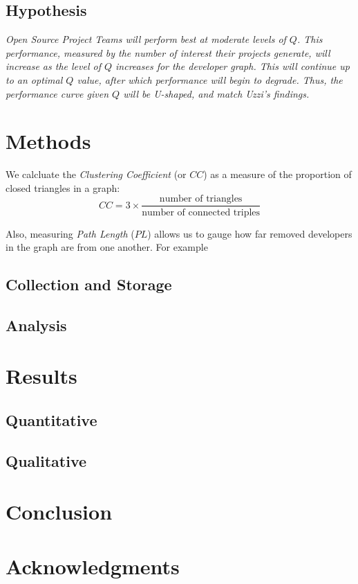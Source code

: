 \documentclass{proc}
\begin{document}
\subsection{Hypothesis}

\textit{Open Source Project Teams will perform best at moderate levels of $Q$. This performance, measured by the number of interest their projects generate, will increase as the level of $Q$ increases for the developer graph. This will continue up to an optimal $Q$ value, after which performance will begin to degrade. Thus, the performance curve given $Q$ will be U-shaped, and match Uzzi's findings\cite{uzzi2005collaboration}. }

\section{Methods}

We calcluate the \textit{Clustering Coefficient} (or $CC$) as a measure of the proportion of closed triangles in a graph\cite{newman2003structure}:
\[CC = 3 \times \frac{\text{number of triangles}}
                    {\text{number of connected triples}}\]

Also, measuring \textit{Path Length} ($PL$) allows us to gauge how far removed developers in the graph are from one another. For example 

\subsection{Collection and Storage}

\subsection{Analysis}

\section{Results}

\subsection{Quantitative}




\subsection{Qualitative}

\section{Conclusion}
\section{Acknowledgments}



\end{document}
